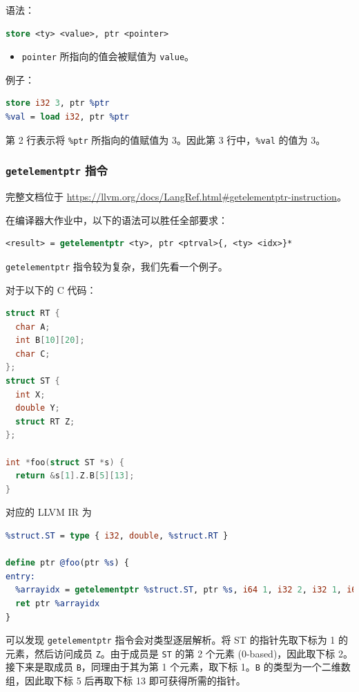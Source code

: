 语法：
\begin{lstlisting}[language=llvm]
store <ty> <value>, ptr <pointer>
\end{lstlisting}

\begin{itemize}
  \item \texttt{pointer} 所指向的值会被赋值为 \texttt{value}。
\end{itemize}

例子：
\begin{lstlisting}[language=llvm]
%ptr = alloca i32
store i32 3, ptr %ptr
%val = load i32, ptr %ptr
\end{lstlisting}

第 2 行表示将 \texttt{\%ptr} 所指向的值赋值为 3。因此第 3 行中，\texttt{\%val}
的值为 3。

\subsubsection{\texttt{getelementptr} 指令}\label{LLVM-gep-instructions}

\begin{remark}
完整文档位于 \url{https://llvm.org/docs/LangRef.html\#getelementptr-instruction}。
\end{remark}

在编译器大作业中，以下的语法可以胜任全部要求：
\begin{lstlisting}[language=llvm]
<result> = getelementptr <ty>, ptr <ptrval>{, <ty> <idx>}*
\end{lstlisting}

\texttt{getelementptr} 指令较为复杂，我们先看一个例子。

对于以下的 C 代码：
\begin{lstlisting}[language=C]
struct RT {
  char A;
  int B[10][20];
  char C;
};
struct ST {
  int X;
  double Y;
  struct RT Z;
};

int *foo(struct ST *s) {
  return &s[1].Z.B[5][13];
}
\end{lstlisting}
对应的 LLVM IR 为
\begin{lstlisting}[language=llvm]
%struct.RT = type { i8, [10 x [20 x i32]], i8 }
%struct.ST = type { i32, double, %struct.RT }

define ptr @foo(ptr %s) {
entry:
  %arrayidx = getelementptr %struct.ST, ptr %s, i64 1, i32 2, i32 1, i64 5, i64 13
  ret ptr %arrayidx
}
\end{lstlisting}

可以发现 \texttt{getelementptr} 指令会对类型逐层解析。将 ST 的指针先取下标为 1 的元素，然后访问成员
\texttt{Z}。由于成员是 \texttt{ST} 的第 2 个元素 (0-based)，因此取下标 2。接下来是取成员
\texttt{B}，同理由于其为第 1 个元素，取下标 1。\texttt{B} 的类型为一个二维数组，因此取下标 5 后再取下标 13
即可获得所需的指针。

